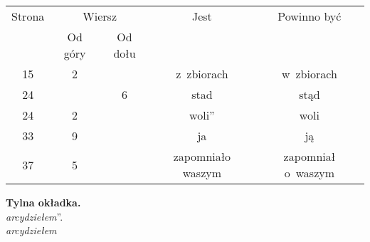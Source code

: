 \documentclass[a4paper,11pt]{article}
\begin{document}
\begin{center}

  \begin{tabular}{|c|c|c|c|c|}
    \hline
    Strona & \multicolumn{2}{c|}{Wiersz} & Jest
                              & Powinno być \\ \cline{2-3}
    & Od góry & Od dołu & & \\
    \hline
    15  & \hphantom{0}2 & & z~zbiorach & w~zbiorach \\
    24  & & \hphantom{0}6 & stad & stąd \\
    24  & \hphantom{0}2 & & woli” & woli \\
    33  & \hphantom{0}9 & & ja & ją \\
    37  & \hphantom{0}5 & & zapomniało waszym & zapomniał o~waszym \\
    \hline
  \end{tabular}

\end{center}

\vspace{\spaceTwo}


\noindent
\textbf{Tylna okładka.} \\
\Jest  \textit{arcydziełem}”. \\
\Powin \textit{arcydziełem} \\












\newpage




\vspace{\spaceFive}
\end{document}
